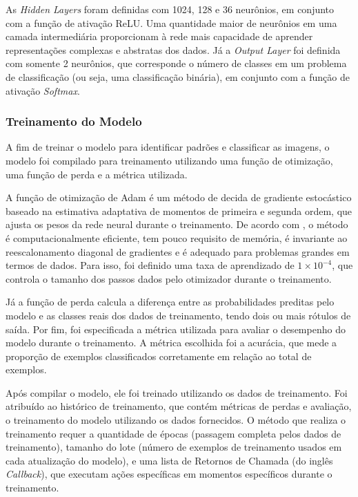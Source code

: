 As \textit{Hidden Layers} foram definidas com 1024, 128 e 36 neurônios, em conjunto com a função de ativação ReLU. Uma quantidade maior de neurônios em uma camada intermediária proporcionam à rede mais capacidade de aprender representações complexas e abstratas dos dados. Já a \textit{Output Layer} foi definida com somente 2 neurônios, que corresponde o número de classes em um problema de classificação (ou seja, uma classificação binária), em conjunto com a função de ativação \textit{Softmax}.


\subsubsection{\esp Treinamento do Modelo} \label{treinamento}

A fim de treinar o modelo para identificar padrões e classificar as imagens, o modelo foi compilado para treinamento utilizando uma função de otimização, uma função de perda e a métrica utilizada. 

A função de otimização de Adam é um método de decida de gradiente estocástico baseado na estimativa adaptativa de momentos de primeira e segunda ordem, que ajusta os pesos da rede neural durante o treinamento. De acordo com , o método é computacionalmente eficiente, tem pouco requisito de memória, é invariante ao reescalonamento diagonal de gradientes e é adequado para problemas grandes em termos de dados. Para isso, foi definido uma taxa de aprendizado de \ensuremath{1 \times 10^{-4}}, que controla o tamanho dos passos dados pelo otimizador durante o treinamento. 

Já a função de perda calcula a diferença entre as probabilidades preditas pelo modelo e as classes reais dos dados de treinamento, tendo dois ou mais rótulos de saída. Por fim, foi especificada a métrica utilizada para avaliar o desempenho do modelo durante o treinamento. A métrica escolhida foi a acurácia, que mede a proporção de exemplos classificados corretamente em relação ao total de exemplos. 

Após compilar o modelo, ele foi treinado utilizando os dados de treinamento. Foi atribuído ao histórico de treinamento, que contém métricas de perdas e avaliação, o treinamento do modelo utilizando os dados fornecidos. O método que realiza o treinamento requer a quantidade de épocas (passagem completa pelos dados de treinamento), tamanho do lote (número de exemplos de treinamento usados em cada atualização do modelo), e uma lista de Retornos de Chamada (do inglês \textit{Callback}), que executam ações específicas em momentos específicos durante o treinamento. 

